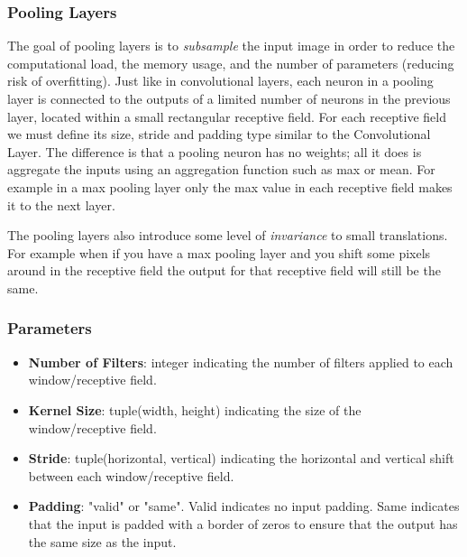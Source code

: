 \documentclass[12pt]{article}
\begin{document}
        \subsubsection{Pooling Layers}
            The goal of pooling layers is to \textit{subsample} the input image in order to reduce the computational
            load, the memory usage, and the number of parameters (reducing risk of overfitting). Just like in
            convolutional layers, each neuron in a pooling layer is connected to the outputs of a limited number of
            neurons in the previous layer, located within a small rectangular receptive field. For each receptive field
            we must define its size, stride and padding type similar to the Convolutional Layer. The difference is that
            a pooling neuron has no weights; all it does is aggregate the inputs using an aggregation function such as
            max or mean. For example in a max pooling layer only the max value in each receptive field makes it to the
            next layer.

            The pooling layers also introduce some level of \textit{invariance} to small translations. For example when
            if you have a max pooling layer and you shift some pixels around in the receptive field the output for that
            receptive field will still be the same. 
        
        \subsubsection{Parameters}
            \begin{itemize}
                \item \textbf{Number of Filters}: integer indicating the number of filters applied to each window/receptive field.
                \item \textbf{Kernel Size}: tuple(width, height) indicating the size of the window/receptive field.
                \item \textbf{Stride}: tuple(horizontal, vertical) indicating the horizontal and vertical shift between
                each window/receptive field. 
                \item \textbf{Padding}: "valid" or "same". Valid indicates no input padding. Same indicates that the
                input is padded with a border of zeros to ensure that the output has the same size as the input.
            \end{itemize}
    
\end{document}
